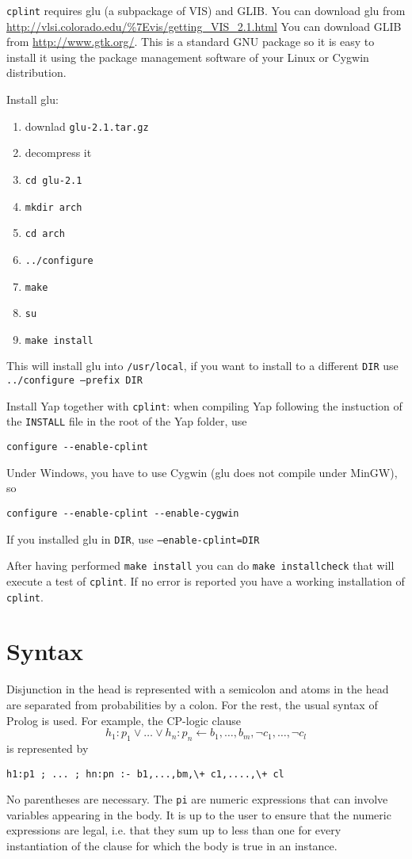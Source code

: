 \documentclass[a4paper,12pt]{article}
\begin{document}
\texttt{cplint} requires glu (a subpackage of VIS) and GLIB.
You can download glu from \href{http://vlsi.colorado.edu/\%7Evis/getting_VIS_2.1.html}{http://vlsi.colorado.edu/\%7Evis/getting\_VIS\_2.1.html}
You can download GLIB from \href{http://www.gtk.org/}{http://www.gtk.org/}. This is a standard GNU package 
so it is easy to install it using the package management software of your Linux or Cygwin 
distribution.

Install glu:
\begin{enumerate}
\item downlad \texttt{glu-2.1.tar.gz}
\item decompress it
\item \texttt{cd glu-2.1}
\item \texttt{mkdir arch}
\item \texttt{cd arch}
\item \texttt{../configure}
\item \texttt{make}
	\item \texttt{su}
	\item \texttt{make install}
\end{enumerate}
This will install glu into \texttt{/usr/local}, if you want to install to a different \texttt{DIR}
use \texttt{../configure --prefix DIR}

Install Yap together with \texttt{cplint}:
when compiling Yap following the instuction of the \texttt{INSTALL} file in the root of the Yap folder, use
\begin{verbatim}
configure --enable-cplint
\end{verbatim}
Under Windows, you have to use Cygwin (glu does not compile under MinGW), so\\
\begin{verbatim}
configure --enable-cplint --enable-cygwin
\end{verbatim}
If you installed glu in \texttt{DIR}, use \texttt{--enable-cplint=DIR}

After having performed \texttt{make install} you can do \texttt{make installcheck} that will execute a test of \texttt{cplint}. If no error is reported you have a working installation of \texttt{cplint}.


\section{Syntax}

Disjunction in the head is represented with a semicolon and atoms in the head are separated from probabilities by a colon. For the rest, the usual syntax of Prolog is used.
For example, the  CP-logic clause
$$h_1:p_1\vee \ldots \vee h_n:p_n\leftarrow b_1,\dots,b_m ,\neg c_1,\ldots,\neg c_l$$
is represented by
\begin{verbatim}
h1:p1 ; ... ; hn:pn :- b1,...,bm,\+ c1,....,\+ cl
\end{verbatim}
 No parentheses are necessary. The \texttt{pi} are numeric expressions that can involve
variables appearing in the body. It is up to the user to ensure that the numeric expressions are legal, i.e. that they sum up to less than one for every instantiation of the clause for which the body is true in an instance.
\end{document}
